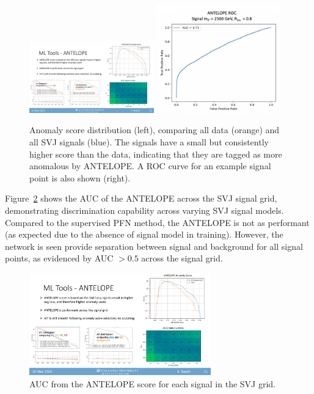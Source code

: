 \begin{figure}[!htbp]
\centering
   \includegraphics[width=0.48\textwidth]{figures/ml/antelope_score.pdf}
   \includegraphics[width=0.48\textwidth]{figures/ml/antelope_roc}
    \caption{Anomaly score distribution (left), comparing all data (orange) and all SVJ signals (blue). The signals have a small but consistently higher score than the data, indicating that they are tagged as more anomalous by ANTELOPE. A ROC curve for an example signal point is also shown (right).
    \label{fig:antelope_score}}
\end{figure}

Figure~\ref{fig:antelope_AUC_score_grid} shows the AUC of the ANTELOPE across the SVJ signal grid, demonstrating discrimination capability across varying SVJ signal models.
Compared to the supervised PFN method, the ANTELOPE is not as performant (as expected due to the absence of signal model in training).
However, the network is seen provide separation between signal and background for all signal points, as evidenced by AUC $> 0.5$ across the signal grid.

\begin{figure}[!htbp]
\centering
   \includegraphics[width=0.7\textwidth]{figures/ml/antelope_AUC_score_grid}
    \caption{AUC from the ANTELOPE score for each signal in the SVJ grid.
    \label{fig:antelope_AUC_score_grid}}
\end{figure}

